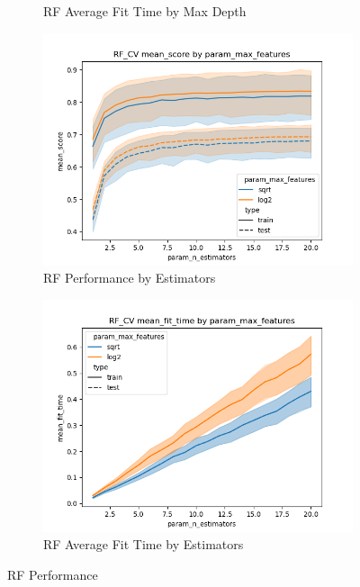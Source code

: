 \documentclass[12pt]{article}
\begin{document}
\begin{figure}
\begin{subfigure}{.5\textwidth}
    \caption{RF Average Fit Time by Max Depth}
  \end{subfigure}
  \begin{subfigure}{.5\textwidth}
    \includegraphics[width=.95\textwidth]{../results/rf_cv/param_max_features_mean_score_param_n_estimators.png}
    \caption{RF Performance by Estimators}
    \end{subfigure}%
  \begin{subfigure}{.5\textwidth}
    \includegraphics[width=.95\textwidth]{../results/rf_cv/param_max_features_mean_fit_time_param_n_estimators.png}
    \caption{RF Average Fit Time by Estimators}
  \end{subfigure}
  \caption{RF Performance}
  \label{figure3}
\end{figure}
\end{document}
